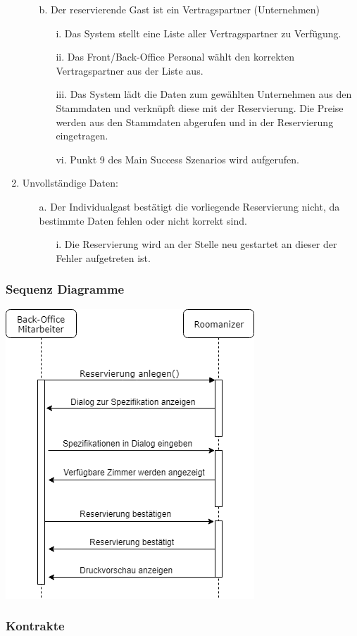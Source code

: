 \documentclass[./detailed_overview_usecases.tex]{subfiles}
\begin{document}
\begin{enumerate}
\begin{itemize}
            \item[b.] Der reservierende Gast ist ein Vertragspartner (Unternehmen)
                \begin{itemize}
                    \item[i.] Das System stellt eine Liste aller Vertragspartner zu Verfügung.
                    \item[ii.] Das Front/Back-Office Personal wählt den korrekten Vertragspartner aus der Liste aus.
                    \item[iii.] Das System lädt die Daten zum gewählten Unternehmen aus den Stammdaten und verknüpft diese mit der Reservierung. Die Preise
                    werden aus den Stammdaten abgerufen und in der Reservierung eingetragen.
                    \item[vi.] Punkt 9 des Main Success Szenarios wird aufgerufen.
                \end{itemize}
        \end{itemize}
        \setcounter{enumi}{8}
        \item Unvollständige Daten: \begin{itemize}
                                        \item[a.] Der Individualgast bestätigt die vorliegende Reservierung nicht, da bestimmte Daten fehlen oder nicht korrekt sind.
                                        \begin{itemize}
                                            \item[i.] Die Reservierung wird an der Stelle neu gestartet an dieser der Fehler aufgetreten ist.
                                        \end{itemize}
                                    \end{itemize}
    \end{enumerate}

    \subsubsection{Sequenz Diagramme}
    \centering
        \includegraphics[width=0.7\linewidth]{./content/usecases/UseCase_ReservierungIndividualgastSequenze.png}
    \subsubsection{Kontrakte}
\end{document}
